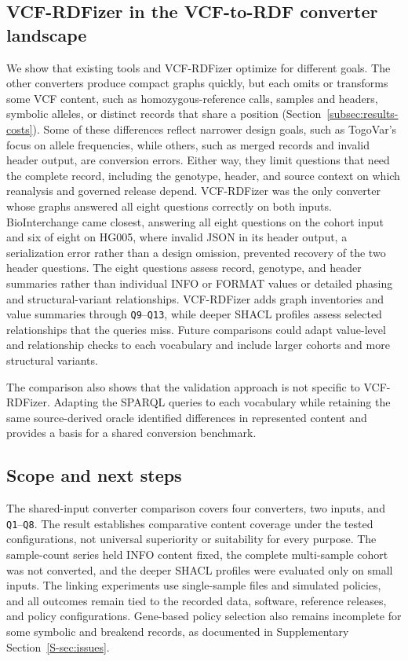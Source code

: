 \documentclass[pdflatex,sn-mathphys-num,referee]{sn-jnl}
\begin{document}
\subsection{VCF-RDFizer in the VCF-to-RDF converter landscape}\label{subsec:other-converters}
We show that existing tools and VCF-RDFizer optimize for different goals.
The other converters produce compact graphs quickly, but each omits or transforms some VCF content, such as homozygous-reference calls, samples and headers, symbolic alleles, or distinct records that share a position (Section~\ref{subsec:results-costs}).
Some of these differences reflect narrower design goals, such as TogoVar's focus on allele frequencies, while others, such as merged records and invalid header output, are conversion errors.
Either way, they limit questions that need the complete record, including the genotype, header, and source context on which reanalysis and governed release depend.
VCF-RDFizer was the only converter whose graphs answered all eight questions correctly on both inputs.
BioInterchange came closest, answering all eight questions on the cohort input and six of eight on HG005, where invalid JSON in its header output, a serialization error rather than a design omission, prevented recovery of the two header questions.
The eight questions assess record, genotype, and header summaries rather than individual INFO or FORMAT values or detailed phasing and structural-variant relationships.
VCF-RDFizer adds graph inventories and value summaries through \texttt{Q9}--\texttt{Q13}, while deeper SHACL profiles assess selected relationships that the queries miss.
Future comparisons could adapt value-level and relationship checks to each vocabulary and include larger cohorts and more structural variants.

The comparison also shows that the validation approach is not specific to VCF-RDFizer.
Adapting the SPARQL queries to each vocabulary while retaining the same source-derived oracle identified differences in represented content and provides a basis for a shared conversion benchmark.

\subsection{Scope and next steps}\label{subsec:disc-scope}
The shared-input converter comparison covers four converters, two inputs, and \texttt{Q1}--\texttt{Q8}.
The result establishes comparative content coverage under the tested configurations, not universal superiority or suitability for every purpose.
The sample-count series held INFO content fixed, the complete multi-sample cohort was not converted, and the deeper SHACL profiles were evaluated only on small inputs.
The linking experiments use single-sample files and simulated policies, and all outcomes remain tied to the recorded data, software, reference releases, and policy configurations.
Gene-based policy selection also remains incomplete for some symbolic and breakend records, as documented in Supplementary Section~\ref{S-sec:issues}.
\end{document}
